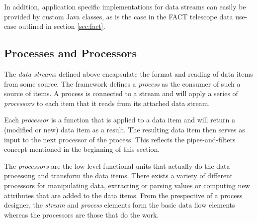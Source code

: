 In addition, application specific implementations for data streams can
easily be provided by custom Java classes, as is the case in the FACT
telescope data use-case outlined in section \ref{sec:fact}.

%


%
%

\subsection{\label{sec:basics}Processes and Processors}
The {\em data stream}s defined above encapsulate the format and reading
of data items from some source. The \streams framework defines a
{\em process} as the consumer of such a source of items. A process is
connected to a stream and will apply a series of {\em processors} to
each item that it reads from its attached data stream.

Each {\em processor} is a function that is applied to a data item and
will return a (modified or new) data item as a result. The resulting
data item then serves as input to the next processor of the
process. This reflects the pipes-and-filters concept mentioned in the
beginning of this section.

The {\em processors} are the low-level functional units that actually
do the data processing and transform the data items. There exists a
variety of different processors for manipulating data, extracting or
parsing values or computing new attributes that are added to the data
items.  From the prespective of a process designer, the {\em stream}
and {\em process} elements form the basic data flow elements whereas
the processors are those that do the work.

